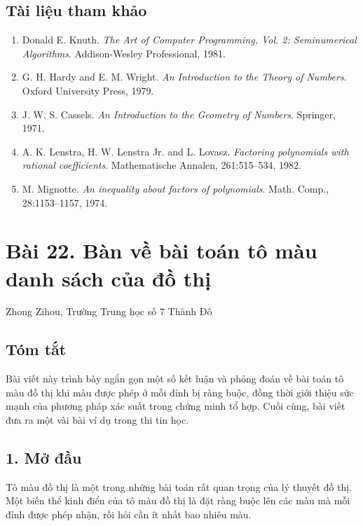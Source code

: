 \documentclass[11pt]{article}
\begin{document}
\subsection*{Tài liệu tham khảo}

\begin{enumerate}
\item Donald E. Knuth. \emph{The Art of Computer Programming,
Vol. 2: Seminumerical Algorithms}. Addison-Wesley Professional, 1981.
\item G. H. Hardy and E. M. Wright. \emph{An Introduction to
the Theory of Numbers}. Oxford University Press, 1979.
\item J. W. S. Cassels. \emph{An Introduction to the
Geometry of Numbers}. Springer, 1971.
\item A. K. Lenstra, H. W. Lenstra Jr. and L. Lovasz.
\emph{Factoring polynomials with rational coefficients}. Mathematische Annalen,
261:515--534, 1982.
\item M. Mignotte. \emph{An inequality about factors of
polynomials}. Math. Comp., 28:1153--1157, 1974.
\end{enumerate}

\section*{Bài 22. Bàn về bài toán tô màu danh sách của đồ thị}

\begin{center}
Zhong Zihou, Trường Trung học số 7 Thành Đô
\end{center}

\subsection*{Tóm tắt}

Bài viết này trình bày ngắn gọn một số kết luận và phỏng đoán về bài toán tô
màu đồ thị khi màu được phép ở mỗi đỉnh bị ràng buộc, đồng thời giới thiệu sức
mạnh của phương pháp xác suất trong chứng minh tổ hợp. Cuối cùng, bài viết đưa
ra một vài bài ví dụ trong thi tin học.

\subsection*{1. Mở đầu}

Tô màu đồ thị là một trong những bài toán rất quan trọng của lý thuyết đồ thị.
Một biến thể kinh điển của tô màu đồ thị là đặt ràng buộc lên các màu mà mỗi
đỉnh được phép nhận, rồi hỏi cần ít nhất bao nhiêu màu.
\end{document}
